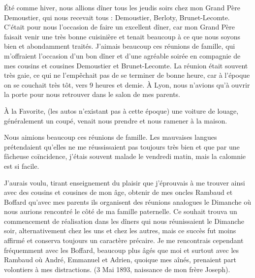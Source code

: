 \documentclass[11pt,a4paper]{report}
\begin{document}
Été comme hiver, nous allions dîner tous les jeudis soirs chez mon Grand Père Demoustier, qui nous recevait tous : Demoustier, Berloty, Brunet-Lecomte. C'était pour nous l'occasion de faire un excellent dîner, car mon Grand Père faisait venir une très bonne cuisinière et tenait beaucoup à ce que nous soyons bien et abondamment traités. J'aimais beaucoup ces réunions de famille, qui m'offraient l'occasion d'un bon dîner et d'une agréable soirée en compagnie de mes cousins et cousines Demoustier et Brunet-Lecomte. La réunion était souvent très gaie, ce qui ne l'empêchait pas de se terminer de bonne heure, car à l'époque on se couchait très tôt, vers 9 heures et demie. À Lyon, nous n'avions qu'à ouvrir la porte pour nous retrouver dans le salon de mes parents.

À la Favorite, (les autos n'existant pas à cette époque) une voiture de louage, généralement un coupé, venait nous prendre et nous ramener à la maison.

Nous aimions beaucoup ces réunions de famille. Les mauvaises langues prétendaient qu'elles ne me réussissaient pas toujours très bien et que par une fâcheuse coïncidence, j'étais souvent malade le vendredi matin, mais la calomnie est si facile.

J'aurais voulu, tirant enseignement du plaisir que j'éprouvais à me trouver ainsi avec des cousins et cousines de mon âge, obtenir de mes oncles Rambaud et Boffard qu'avec mes parents ils organisent des réunions analogues le Dimanche où nous aurions rencontré le côté de ma famille paternelle. Ce souhait trouva un commencement de réalisation dans les dîners qui nous réunissaient le Dimanche soir, alternativement chez les uns et chez les autres, mais ce succès fut moins affirmé et conserva toujours un caractère précaire. Je me rencontrais cependant fréquemment avec les Boffard, beaucoup plus âgés que moi et surtout avec les Rambaud où André, Emmanuel et Adrien, quoique mes aînés, prenaient part volontiers à mes distractions. (3 Mai 1893, naissance de mon frère Joseph).
\end{document}
